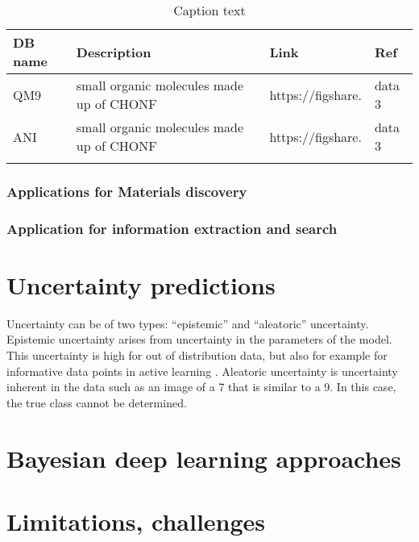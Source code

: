 \documentclass[pdflatex,sn-mathphys]{sn-jnl}%
\theoremstyle{thmstyleone}%
\theoremstyle{thmstyletwo}%
\theoremstyle{thmstylethree}%
\begin{document}
\begin{table}[h]

\begin{minipage}{174pt}
\caption{Caption text}\label{tab:nlp-sw}%
\begin{tabular}{@{}llll@{}}
\toprule
DB name & Description & Link  & Ref\\
\midrule
QM9   &  small organic molecules made up of CHONF  & https://figshare.   & data 3  \\

ANI   &  small organic molecules made up of CHONF  & https://figshare.   & data 3  \\


\botrule
\end{tabular}
\end{minipage}
\end{table}



\subsubsection{Applications for Materials discovery}

\subsubsection{Application for information extraction and search}


\section{Uncertainty predictions}\label{sec:uncertainty}
Uncertainty can be of two types: “epistemic” and “aleatoric” uncertainty. Epistemic uncertainty arises from uncertainty in the parameters of the model. This uncertainty is high for out of distribution data, but also for example for informative data points in active learning . Aleatoric uncertainty is uncertainty inherent in the data such as an image of a 7 that is similar to a 9. In this case, the true class cannot be determined.

\section{Bayesian deep learning approaches}\label{sec:bayesian}


\section{Limitations, challenges}\label{sec:challenges}
\end{document}
